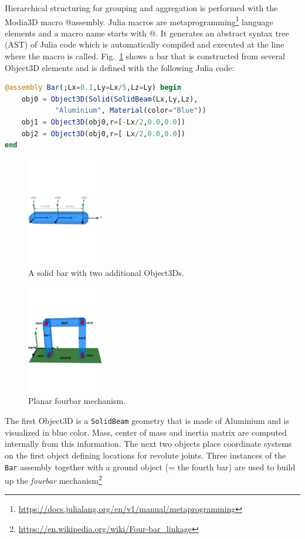 Hierarchical structuring for grouping and aggregation is performed with the Modia3D macro @assembly. Julia macros are metaprogramming\footnote{\href{https://docs.julialang.org/en/v1/manual/metaprogramming}{https://docs.julialang.org/en/v1/manual/metaprogramming}} language elements and a macro name starts with @. It generates an abstract syntax tree (AST) of Julia code which is automatically compiled and executed at the line where the macro is called. 
Fig.~\ref{fig:bar} shows a bar that is constructed from several Object3D elements
and is defined with the following Julia code:
\begin{lstlisting}[language = Julia]
@assembly Bar(;Lx=0.1,Ly=Lx/5,Lz=Ly) begin 
    obj0 = Object3D(Solid(SolidBeam(Lx,Ly,Lz), 
			"Aluminium", Material(color="Blue"))
	obj1 = Object3D(obj0,r=[-Lx/2,0.0,0.0]) 
	obj2 = Object3D(obj0,r=[ Lx/2,0.0,0.0]) 
end
\end{lstlisting}
\begin{figure}[htb]
	\centering
	\includegraphics[width=0.3\textwidth]{figures/bar.pdf}  
	\caption{A solid bar with two additional Object3Ds.\label{fig:bar}}
\end{figure}
\begin{figure}[htb]
	\centering
	\includegraphics[width=0.3\textwidth]{figures/fourBar.pdf}  
	\caption{Planar fourbar mechanism.\label{fig:Fourbar}}
\end{figure}
The first Object3D is a \texttt{SolidBeam} geometry that is made of Aluminium and is visualized in blue color. Mass, center of mass and inertia matrix are computed internally from this information. The next two objects place coordinate systems on the first object defining locations for revolute joints. Three instances of the \texttt{Bar} assembly together with a ground object  (= the fourth bar) are used to build up the \emph{fourbar} mechanism\footnote{\href{https://en.wikipedia.org/wiki/Four-bar\_linkage}{https://en.wikipedia.org/wiki/Four-bar\_linkage}}
